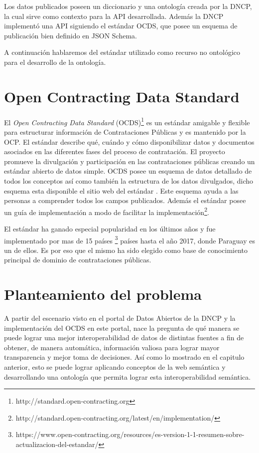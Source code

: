 Los datos publicados poseen un diccionario y una ontología creada por la DNCP, la cual sirve como contexto para la API desarrollada. Además la DNCP implementó una API siguiendo el estándar OCDS, que posee un esquema de publicación bien definido en JSON Schema.

A continuación hablaremos del estándar utilizado como recurso no ontológico para el desarrollo de la ontología.

\section{Open Contracting Data Standard}
\label{section:OCDS}

El \textit{Open Contracting Data Standard} (OCDS)\footnote{http://standard.open-contracting.org}  es un estándar amigable y flexible para estructurar información de Contrataciones Públicas y es mantenido por la OCP. El estándar describe qué, cuándo y cómo disponibilizar datos y documentos asociados en las diferentes fases del proceso de contratación. El proyecto promueve la divulgación y participación en las contrataciones públicas creando un estándar abierto de datos simple. OCDS posee un esquema de datos detallado de todos los conceptos así como también la estructura de los datos divulgados, dicho esquema esta disponible el sitio web del estándar \cite{OCDSReleaseSchema:online}. Este esquema ayuda a las personas a comprender todos los campos publicados. Además el estándar posee un guía de implementación a modo de facilitar la implementación\footnote{http://standard.open-contracting.org/latest/en/implementation/}.

El estándar ha ganado especial popularidad en los últimos años y fue implementado por mas de 15 países \footnote{https://www.open-contracting.org/resources/es-version-1-1-resumen-sobre-actualizacion-del-estandar/} países hasta el año 2017, donde Paraguay es un de ellos. Es por eso que el mismo ha sido elegido como base de conocimiento principal de dominio de contrataciones públicas.

\section{Planteamiento del problema}
\label{section:planteamientoDelProblema}

A partir del escenario visto en el portal de Datos Abiertos de la DNCP y la implementación del OCDS en este portal, nace la pregunta de qué manera se puede lograr una mejor interoperabilidad de datos de distintas fuentes a fin de obtener, de manera automática, información valiosa para lograr mayor transparencia y mejor toma de decisiones. Así como lo mostrado en el capitulo anterior, esto se puede lograr aplicando conceptos de la web semántica y desarrollando una ontología que permita lograr esta interoperabilidad semántica. 

